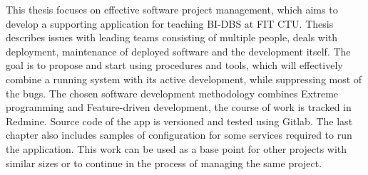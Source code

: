 This thesis focuses on effective software project management, which aims to develop a supporting application for teaching BI-DBS at FIT CTU. Thesis describes issues with leading teams consisting of multiple people, deals with deployment, maintenance of deployed software and the development itself. The goal is to propose and start using procedures and tools, which will effectively combine a running system with its active development, while suppressing most of the bugs. The chosen software development methodology combines Extreme programming and Feature-driven development, the course of work is tracked in Redmine. Source code of the app is versioned and tested using Gitlab. The last chapter also includes samples of configuration for some services required to run the application. This work can be used as a base point for other projects with similar sizes or to continue in the process of managing the same project.